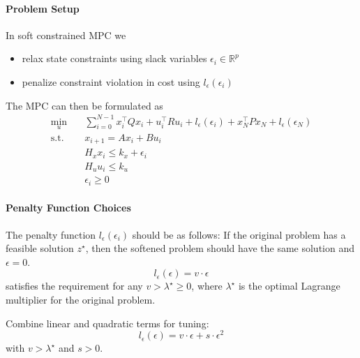 \paragraph{Problem Setup}
In soft constrained MPC we
\begin{itemize}
    \item relax state constraints using slack variables $\epsilon_i \in \mathbb{R}^p$
    \item penalize constraint violation in cost using $l_\epsilon(\epsilon_i)$
\end{itemize}
The MPC can then be formulated as
\begin{align*}
    \min_u \quad      & \sum_{i=0}^{N-1} x_i^\top Q x_i + u_i^\top R u_i + l_\epsilon(\epsilon_i) + x_N^\top P x_N + l_\epsilon(\epsilon_N) \\
    \text{s.t.} \quad & x_{i+1} = A x_i + B u_i                                                                                             \\
                      & H_x x_i \leq k_x + \epsilon_i                                                                                       \\
                      & H_u u_i \leq k_u                                                                                                    \\
                      & \epsilon_i \geq 0
\end{align*}

\paragraph{Penalty Function Choices}

The penalty function $l_\epsilon(\epsilon_i)$ should be as follows: If the original problem has a feasible solution $z^\star$, then the softened problem should have the same solution and $\epsilon = 0$.
\newpar{}
\begin{equation*}
    l_\epsilon(\epsilon) = v \cdot \epsilon
\end{equation*}
satisfies the requirement for any $v > \lambda^\star \geq 0$, where $\lambda^\star$ is the optimal Lagrange multiplier for the original problem.
\newpar{}

Combine linear and quadratic terms for tuning:
\begin{equation*}
    l_\epsilon(\epsilon) = v \cdot \epsilon + s \cdot \epsilon^2
\end{equation*}
with $v > \lambda^\star$ and $s > 0$.

